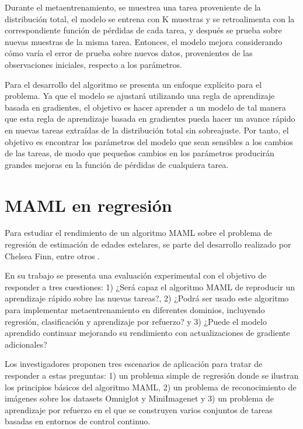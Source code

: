 Durante el metaentrenamiento, se muestrea una tarea proveniente de la distribución total, el modelo se entrena con K muestras y se retroalimenta con la correspondiente función de pérdidas de cada tarea, y después se prueba sobre nuevas muestras de la misma tarea. Entonces, el modelo mejora considerando cómo varía el error de prueba sobre nuevos datos, provenientes de las observaciones iniciales, respecto a los parámetros.

Para el desarrollo del algoritmo se presenta un enfoque explícito para el problema. Ya que el modelo se ajustará utilizando una regla de aprendizaje basada en gradientes, el objetivo es hacer aprender a un modelo de tal manera que esta regla de aprendizaje basada en gradientes pueda hacer un avance rápido en nuevas tareas extraídas de la distribución total sin sobreajuste. Por tanto, el objetivo es encontrar los parámetros del modelo que sean sensibles a los cambios de las tareas, de modo que pequeños cambios en los parámetros producirán grandes mejoras en la función de pérdidas de cualquiera tarea. 


\section{MAML en regresión}

Para estudiar el rendimiento de un algoritmo MAML sobre el problema de regresión de estimación de edades estelares, se parte del desarrollo realizado por Chelsea Finn, entre otros \cite{finn2017modelagnostic}. 

En su trabajo se presenta una evaluación experimental con el objetivo de responder a tres cuestiones: 1) ¿Será capaz el algoritmo MAML de reproducir un aprendizaje rápido sobre las nuevas tareas?, 2) ¿Podrá ser usado este algoritmo para implementar metaentrenamiento en diferentes dominios, incluyendo regresión, clasificación y aprendizaje por refuerzo? y 3) ¿Puede el modelo aprendido continuar mejorando su rendimiento con actualizaciones de gradiente adicionales?

Los investigadores proponen tres escenarios de aplicación para tratar de responder a estas preguntas: 1) un problema simple de regresión donde se ilustran los principios básicos del algoritmo MAML, 2) un problema de reconocimiento de imágenes sobre los datasets Omniglot y MiniImagenet y 3) un problema de aprendizaje por refuerzo en el que se construyen varios conjuntos de tareas basadas en entornos de control continuo.


